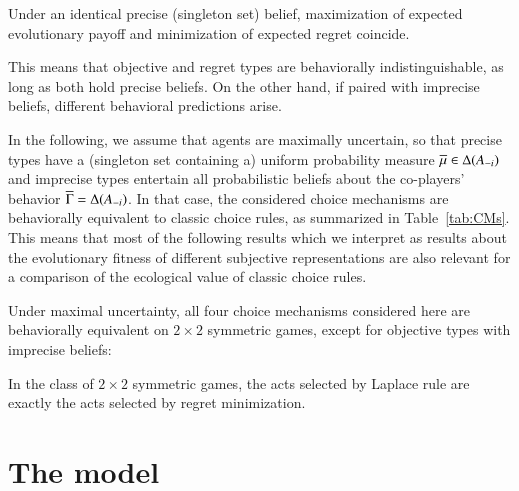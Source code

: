 \documentclass[fleqn,reqno,11pt]{article}
\begin{document}
\iffalse
\begin{fact} \label{fact:singleton probability set}
Maximinimization under a precise (singleton set) belief is just standard
maximization of expected utility (Definition~\ref{def:rationality}).
\end{fact}
\fi

\begin{fact} \label{fact:maxEU-minReg} 
Under an identical precise (singleton set) belief, maximization of expected evolutionary payoff and minimization of expected regret coincide. %
\end{fact}

\noindent This means that objective and regret types are behaviorally indistinguishable, as long as both hold precise beliefs. 
On the other hand, if paired with imprecise beliefs, different behavioral predictions
arise.

In the following, we assume that agents are maximally uncertain, so that precise types have a
(singleton set containing a) uniform probability measure
$\overline{\mu} \in \Delta(A_{-i})$ and imprecise types entertain all probabilistic beliefs
about the co-players' behavior $\overline{\Gamma} = \Delta(A_{-i})$. In that case, the
considered choice mechanisms are behaviorally equivalent to classic choice rules, as summarized
in Table~\ref{tab:CMs}. This means that most of the following results which we interpret as results about the evolutionary fitness of different subjective representations are also relevant for a comparison of the ecological value of classic choice
rules.

Under maximal uncertainty, all four choice mechanisms considered here are behaviorally
equivalent on $2 \times 2$ symmetric games, except for objective types with
imprecise beliefs:

\begin{fact} \label{fact:equivalence2x2} In the class of $2 \times 2$ symmetric games, the acts
  selected by Laplace rule are exactly the acts selected by regret minimization.
\end{fact} 


\section{The model}
\label{sec:basic-model-1}
\end{document}
